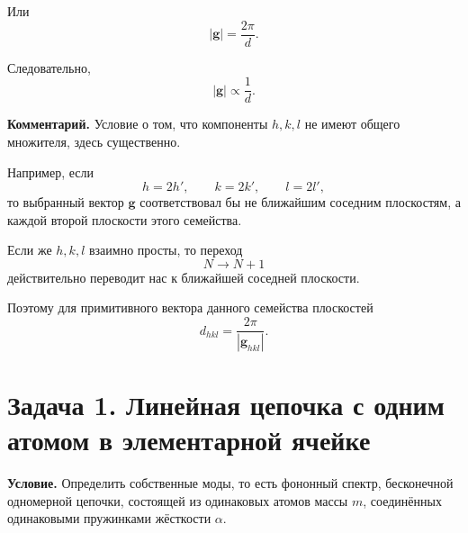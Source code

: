 \documentclass[../final.tex]{subfiles}
\begin{document}
Или
%
\begin{equation*}
    \boxed{
        |\mathbf g|
        =
        \frac{2\pi}{d}
    }.
\end{equation*}

Следовательно,
%
\begin{equation*}
    \boxed{
        |\mathbf g|
        \propto
        \frac{1}{d}
    }.
\end{equation*}

\textbf{Комментарий.}
Условие о том, что компоненты $h,k,l$ не имеют общего
множителя, здесь существенно.

Например, если
%
\begin{equation*}
    h=2h',
    \qquad
    k=2k',
    \qquad
    l=2l',
\end{equation*}
%
то выбранный вектор $\mathbf g$ соответствовал бы не ближайшим
соседним плоскостям, а каждой второй плоскости этого семейства.

Если же $h,k,l$ взаимно просты, то переход
%
\begin{equation*}
    N\longrightarrow N+1
\end{equation*}
%
действительно переводит нас к ближайшей соседней плоскости.

Поэтому для примитивного вектора данного семейства плоскостей
%
\begin{equation*}
    \boxed{
        d_{hkl}
        =
        \frac{2\pi}{
            |\mathbf g_{hkl}|
        }
    }.
\end{equation*}






\section{Задача 1. Линейная цепочка с одним атомом в элементарной ячейке}

\textbf{Условие.}
Определить собственные моды, то есть фононный спектр,
бесконечной одномерной цепочки, состоящей из одинаковых
атомов массы $m$, соединённых одинаковыми пружинками
жёсткости $\alpha$.


%
%
\end{document}
